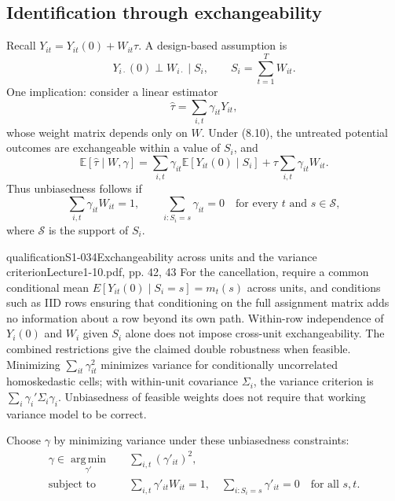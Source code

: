 \subsection{Identification through exchangeability}
Recall $Y_{it}=Y_{it}(0)+W_{it}\tau$. A design-based assumption is
\[
 Y_{i\cdot}(0)\perp W_{i\cdot}\mid S_i,
 \qquad S_i=\sum_{t=1}^TW_{it}.\tag{8.10}
\]
One implication: consider a linear estimator
\[
 \widehat\tau=\sum_{i,t}\gamma_{it}Y_{it},\tag{8.11}
\]
whose weight matrix depends only on $W$. Under (8.10), the untreated potential outcomes are exchangeable within a value of $S_i$, and
\[
 \mathbb E[\widehat\tau\mid W,\gamma]
 =\sum_{i,t}\gamma_{it}\mathbb E[Y_{it}(0)\mid S_i]
 +\tau\sum_{i,t}\gamma_{it}W_{it}.
\]
Thus unbiasedness follows if
\[
 \sum_{i,t}\gamma_{it}W_{it}=1,
 \qquad
 \sum_{i:S_i=s}\gamma_{it}=0
 \quad\text{for every }t\text{ and }s\in\mathcal S,
\]
where $\mathcal S$ is the support of $S_i$. 
\begin{reviewnote}{qualification}{S1-034}{Exchangeability across units and the variance criterion}{Lecture1-10.pdf, pp. 42, 43}
For the cancellation, require a common conditional mean $E[Y_{it}(0)\mid S_i=s]=m_t(s)$ across units, and conditions such as IID rows ensuring that conditioning on the full assignment matrix adds no information about a row beyond its own path. Within-row independence of $Y_i(0)$ and $W_i$ given $S_i$ alone does not impose cross-unit exchangeability. The combined restrictions give the claimed double robustness when feasible. Minimizing $\sum_{it}\gamma_{it}^2$ minimizes variance for conditionally uncorrelated homoskedastic cells; with within-unit covariance $\Sigma_i$, the variance criterion is $\sum_i\gamma_i'\Sigma_i\gamma_i$. Unbiasedness of feasible weights does not require that working variance model to be correct.
\end{reviewnote}


Choose $\gamma$ by minimizing variance under these unbiasedness constraints:
\begin{align*}
 \gamma\in\operatorname*{arg\,min}_{\gamma'}\quad&\sum_{i,t}(\gamma'_{it})^2,\\
 \text{subject to}\quad&\sum_{i,t}\gamma'_{it}W_{it}=1,
 \quad\sum_{i:S_i=s}\gamma'_{it}=0\quad\text{for all }s,t.\tag{8.14}
\end{align*}

